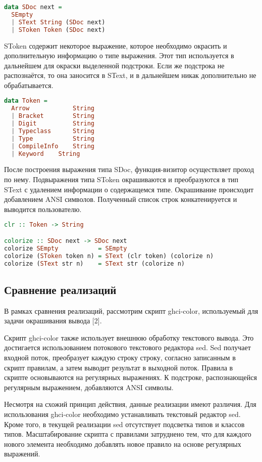 \begin{lstlisting}[language=Haskell]
data SDoc next =
  SEmpty
  | SText String (SDoc next)
  | SToken Token (SDoc next)
\end{lstlisting}
SToken содержит некоторое выражение, которое необходимо окрасить и дополнительную информацию о типе выражения. Этот тип используется в дальнейшем для окраски выделенной подстроки. Если же подстрока не распознаётся, то она заносится в SText, и в дальнейшем никак дополнительно не обрабатывается.
\newline
\begin{lstlisting}[language=Haskell]
data Token =
  Arrow            String
  | Bracket        String
  | Digit          String
  | Typeclass      String
  | Type           String
  | CompileInfo    String 
  | Keyword	   String
\end{lstlisting}

После построения выражения типа SDoc, функция-визитор осуществляет проход по нему. Подвыражения типа SToken окрашиваются и преобразуются в тип SText с удалением информации о содержащемся типе. Окрашивание происходит добавлением ANSI символов. Полученный список строк конкатенируется и выводится пользователю.


\begin{lstlisting}[language=Haskell, caption=Окрашивание выражения]
clr :: Token -> String

colorize :: SDoc next -> SDoc next
colorize SEmpty           = SEmpty
colorize (SToken token n) = SText (clr token) (colorize n)
colorize (SText str n)    = SText str (colorize n)
\end{lstlisting}

\subsection{Сравнение реализаций}
В рамках сравнения реализаций, рассмотрим скрипт ghci-color, используемый для задачи окрашивания вывода [2].

Скрипт ghci-color также использует внешнюю обработку текстового вывода. Это достигается использованием потокового текстового редактора sed. Sed получает входной поток, преобразует каждую строку строку, согласно записанным в скрипт правилам, а затем выводит результат в выходной поток. Правила в скрипте основываются на регулярных выражениях. К подстроке, распознающейся регулярным выражением, добавляются ANSI символы.

Несмотря на схожий принцип действия, данные реализации имеют различия. Для использования ghci-color необходимо устанавливать текстовый редактор sed. Кроме того, в текущей реализации sed отсутствует подсветка типов и классов типов. Масштабирование скрипта с правилами затруднено тем, что для каждого нового элемента необходимо добавлять новое правило на основе регулярных выражений.

